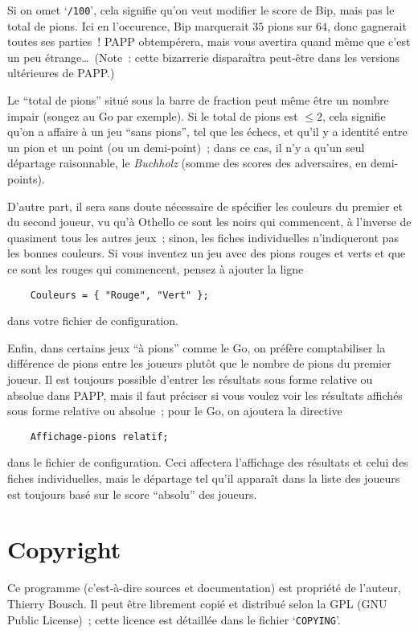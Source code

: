 \documentclass[10pt]{article}
\begin{document}
Si on omet `\verb|/100|', cela signifie qu'on veut modifier le score 
de Bip, mais pas le total de pions.  Ici en l'occurence, Bip 
marquerait $35$ pions sur $64$, donc gagnerait toutes ses parties~!  
PAPP obtempérera, mais vous avertira quand même que c'est un peu 
étrange\dots\ (Note~: cette bizarrerie disparaîtra peut-être 
dans les versions ultérieures de PAPP.)

	Le ``total de pions'' situé sous la barre de fraction peut
même être un nombre impair (songez au Go par exemple). Si le total
de pions est $\le2$, cela signifie qu'on a affaire à un jeu ``sans
pions'', tel que les échecs, et qu'il y a identité entre un pion et un
point (ou un demi-point)~; dans ce cas, il n'y a qu'un seul départage
raisonnable, le {\em Buchholz\/} (somme des scores des adversaires, en
demi-points). 

	D'autre part, il sera sans doute nécessaire de spécifier les
couleurs du premier et du second joueur, vu qu'à Othello ce sont les
noirs qui commencent, à l'inverse de quasiment tous les autres jeux~;
sinon, les fiches individuelles n'indiqueront pas les bonnes couleurs.
Si vous inventez un jeu avec des pions rouges et verts et que ce sont
les rouges qui commencent, pensez à ajouter la ligne
\begin{verbatim}
    Couleurs = { "Rouge", "Vert" };
\end{verbatim}
dans votre fichier de configuration.

	Enfin, dans certains jeux ``à pions'' comme le Go, on préfère
comptabiliser la différence de pions entre les joueurs plut\^ot que le
nombre de pions du premier joueur. Il est toujours possible d'entrer les
résultats sous forme relative ou absolue dans PAPP, mais il faut
préciser si vous voulez voir les résultats affichés sous forme
relative ou absolue~; pour le Go, on ajoutera la directive
\begin{verbatim}
    Affichage-pions relatif;
\end{verbatim}
dans le fichier de configuration. Ceci affectera l'affichage des
résultats et celui des fiches individuelles, mais le départage tel
qu'il apparaît dans la liste des joueurs est toujours basé sur le
score ``absolu'' des joueurs.

\section{Copyright}

	Ce programme (c'est-à-dire sources et documentation) est
propriété de l'auteur, Thierry Bousch. Il peut être librement
copié et distribué selon la GPL (GNU Public License)~; cette licence
est détaillée dans le fichier `\verb|COPYING|'.
\end{document}
